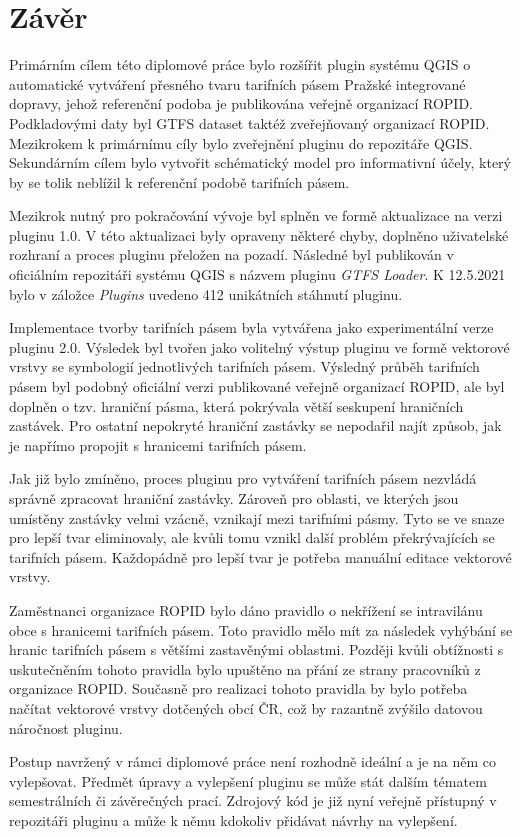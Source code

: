 \chapter*{Závěr}
\label{6-zaver}

Primárním cílem této diplomové práce bylo rozšířit plugin systému QGIS 
o automatické vytváření přesného tvaru tarifních pásem Pražské integrované dopravy, 
jehož referenční podoba je publikována veřejně organizací ROPID.  
Podkladovými daty byl GTFS dataset taktéž zveřejňovaný organizací ROPID.
Mezikrokem k primárnímu cíly bylo zveřejnění pluginu do repozitáře QGIS. Sekundárním cílem bylo vytvořit schématický model pro 
informativní účely, který by se tolik neblížil k referenční podobě tarifních pásem.

Mezikrok nutný pro pokračování vývoje byl splněn ve formě aktualizace na verzi pluginu 1.0.
V této aktualizaci byly opraveny některé chyby, doplněno uživatelské rozhraní a proces pluginu přeložen na pozadí. 
Následné byl publikován v oficiálním repozitáři systému QGIS s názvem pluginu \textit{GTFS Loader}. 
K 12.5.2021 bylo v záložce \textit{Plugins} uvedeno 412 unikátních stáhnutí pluginu.

Implementace tvorby tarifních pásem byla vytvářena jako experimentální verze pluginu 2.0. Výsledek
byl tvořen jako volitelný výstup pluginu ve formě vektorové vrstvy se symbologií jednotlivých tarifních pásem.
Výsledný průběh tarifních pásem byl podobný oficiální verzi publikované veřejně organizací ROPID, ale byl doplněn o tzv. hraniční pásma,
která pokrývala větší seskupení hraničních zastávek. Pro ostatní nepokryté hraniční zastávky 
se nepodařil najít způsob, jak je napřímo propojit s hranicemi tarifních pásem.

Jak již bylo zmíněno, proces pluginu pro vytváření tarifních pásem nezvládá správně zpracovat hraniční zastávky.
Zároveň pro oblasti, ve kterých jsou umístěny zastávky velmi vzácně, vznikají  mezi tarifními pásmy.
Tyto  se ve snaze pro lepší tvar eliminovaly, ale kvůli tomu vznikl další problém překrývajících se tarifních pásem.
Každopádně pro lepší tvar je potřeba manuální editace vektorové vrstvy.

Zaměstnanci organizace ROPID bylo dáno pravidlo o nekřížení se intravilánu obce s hranicemi tarifních pásem.
Toto pravidlo mělo mít za následek vyhýbání se hranic tarifních pásem s většími zastavěnými oblastmi.
Později kvůli obtížnosti s uskutečněním tohoto pravidla bylo upuštěno na přání ze strany pracovníků z organizace ROPID.
Současně pro realizaci tohoto pravidla by bylo potřeba načítat vektorové vrstvy
dotčených obcí ČR, což by razantně zvýšilo datovou náročnost pluginu.

Postup navržený v rámci diplomové práce není rozhodně ideální a je na něm co vylepšovat. Předmět úpravy a vylepšení pluginu
se může stát dalším tématem semestrálních či závěrečných prací. Zdrojový kód
je již nyní veřejně přístupný v repozitáři pluginu a může k němu kdokoliv přidávat
návrhy na vylepšení.  

